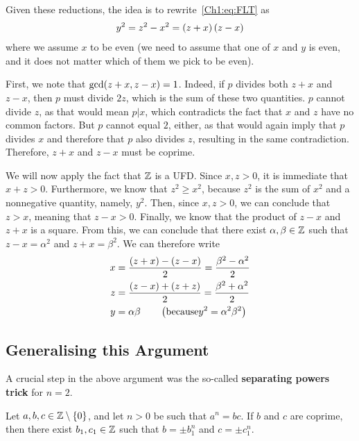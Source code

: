 Given these reductions, the idea is to rewrite~\eqref{Ch1:eq:FLT} as
\begin{align*}
    y^2 = z^2 - x^2 = \left( z + x \right)\left( z - x \right)
\end{align*}
where we assume $x$ to be even (we need to assume that one of $x$ and $y$ is even, and it does not matter which of them we pick to be even).

First, we note that $\gcd\!\left( z + x, z - x \right) = 1$. Indeed, if $p$ divides both $z + x$ and $z - x$, then $p$ must divide $2z$, which is the sum of these two quantities. $p$ cannot divide $z$, as that would mean $p \vert x$, which contradicts the fact that $x$ and $z$ have no common factors. But $p$ cannot equal $2$, either, as that would again imply that $p$ divides $x$ and therefore that $p$ also divides $z$, resulting in the same contradiction. Therefore, $z + x$ and $z - x$ must be coprime.

We will now apply the fact that $\mathbb{Z}$ is a UFD. Since $x, z > 0$, it is immediate that $x + z > 0$. Furthermore, we know that $z^2 \geq x^2$, because $z^2$ is the sum of $x^2$ and a nonnegative quantity, namely, $y^2$. Then, since $x, z > 0$, we can conclude that $z > x$, meaning that $z - x > 0$. Finally, we know that the product of $z - x$ and $z + x$ is a square. From this, we can conclude that there exist $\alpha, \beta \in \mathbb{Z}$ such that $z - x = \alpha^2$ and $z + x = \beta^2$. We can therefore write
\begin{align*}
    x &= \frac{\left( z + x \right) - \left( z - x \right)}{2} = \frac{\beta^2 - \alpha^2}{2} \\
    z &= \frac{\left( z - x \right) + \left( z + z \right)}{2} = \frac{\beta^2 + \alpha^2}{2} \\
    y &= \alpha \beta \qquad \left( \text{because} y^2 = \alpha^2 \beta^2 \right)
\end{align*}

\subsection{Generalising this Argument}

A crucial step in the above argument was the so-called \textbf{separating powers trick} for $n = 2$.

\begin{boxlemma}
    Let $a, b, c \in \mathbb{Z} \setminus \left\{ 0 \right\}$, and let $n > 0$ be such that $a^n = b c$. If $b$ and $c$ are coprime, then there exist $b_1, c_1 \in \mathbb{Z}$ such that $b = \pm b_1 ^ n$ and $c = \pm c_1 ^ n$.
\end{boxlemma}

